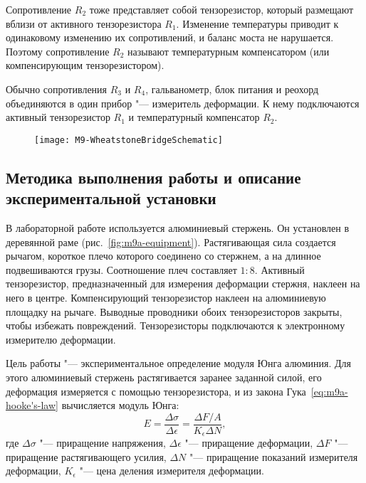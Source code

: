 \documentclass[a4paper, 12pt]{extarticle}
\newcommand{\eps}{\epsilon}
\begin{document}
Сопротивление $R_2$ тоже представляет собой тензорезистор, который размещают вблизи от активного тензорезистора $R_1$. Изменение температуры приводит к одинаковому изменению их сопротивлений, и баланс моста не нарушается. Поэтому сопротивление $R_2$ называют температурным компенсатором (или компенсирующим тензорезистором).

Обычно сопротивления $R_3$ и $R_4$, гальванометр, блок питания и реохорд объединяются в один прибор "--- измеритель деформации. К нему подключаются активный тензорезистор $R_1$ и температурный компенсатор $R_2$. 

\begin{figure}[h]
\begin{center}
\texttt{[image: M9-WheatstoneBridgeSchematic]}
\end{center}
\caption{\label{fig:m9a-scheme}}
\end{figure}

\subsection{Методика выполнения работы и описание экспериментальной установки}
В лабораторной работе используется алюминиевый стержень. Он установлен в деревянной раме (рис.~\ref{fig:m9a-equipment}). Растягивающая сила создается рычагом, короткое плечо которого соединено со стержнем, а на длинное подвешиваются грузы. Соотношение плеч составляет $1:8$. Активный тензорезистор, предназначенный для измерения деформации стержня, наклеен на него в центре. Компенсирующий тензорезистор наклеен на алюминиевую площадку на рычаге. Выводные проводники обоих тензорезисторов закрыты, чтобы избежать повреждений. Тензорезисторы подключаются к электронному измерителю деформации. 

Цель работы "--- экспериментальное определение модуля Юнга алюминия. Для этого алюминиевый стержень растягивается заранее заданной силой, его деформация измеряется с помощью тензорезистора, и из закона Гука~\eqref{eq:m9a-hooke's-law} вычисляется модуль Юнга: 
\begin{equation}
\label{eq:m9a-young's-modulus}
E = \frac{\Delta \sigma}{\Delta \eps} = \frac{\Delta F / A}{K_\eps \Delta N},
\end{equation}
где $\Delta \sigma$ "--- приращение напряжения, $\Delta \eps$ "--- приращение деформации, $\Delta F$ "--- приращение растягивающего усилия, $\Delta N$  "--- приращение показаний измерителя деформации, $K_\eps$ "--- цена деления измерителя деформации. 
\end{document}
